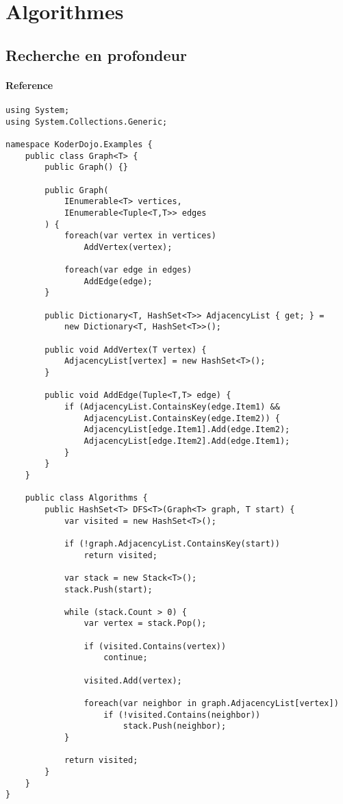 \newpage
\section{Algorithmes}
\label{algorithms}

\subsection{Recherche en profondeur} 
\paragraph{Reference} \cite{Algorithm2}
\begin{lstlisting}
using System;
using System.Collections.Generic;

namespace KoderDojo.Examples {
    public class Graph<T> {
        public Graph() {}

        public Graph(
            IEnumerable<T> vertices,
            IEnumerable<Tuple<T,T>> edges
        ) {
            foreach(var vertex in vertices)
                AddVertex(vertex);

            foreach(var edge in edges)
                AddEdge(edge);
        }

        public Dictionary<T, HashSet<T>> AdjacencyList { get; } =
            new Dictionary<T, HashSet<T>>();

        public void AddVertex(T vertex) {
            AdjacencyList[vertex] = new HashSet<T>();
        }

        public void AddEdge(Tuple<T,T> edge) {
            if (AdjacencyList.ContainsKey(edge.Item1) &&
                AdjacencyList.ContainsKey(edge.Item2)) {
                AdjacencyList[edge.Item1].Add(edge.Item2);
                AdjacencyList[edge.Item2].Add(edge.Item1);
            }
        }
    }

    public class Algorithms {
        public HashSet<T> DFS<T>(Graph<T> graph, T start) {
            var visited = new HashSet<T>();

            if (!graph.AdjacencyList.ContainsKey(start))
                return visited;
                
            var stack = new Stack<T>();
            stack.Push(start);

            while (stack.Count > 0) {
                var vertex = stack.Pop();

                if (visited.Contains(vertex))
                    continue;

                visited.Add(vertex);

                foreach(var neighbor in graph.AdjacencyList[vertex])
                    if (!visited.Contains(neighbor))
                        stack.Push(neighbor);
            }

            return visited;
        }
    }
}
\end{lstlisting}    

